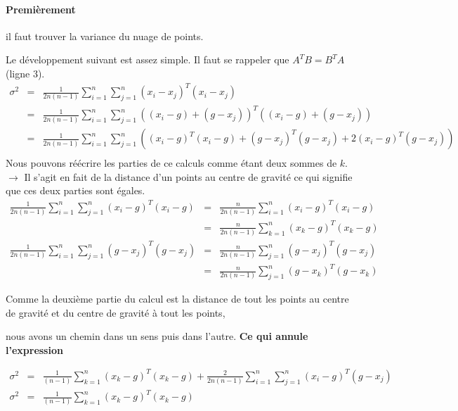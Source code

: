 \documentclass[a4paper, 11pt, onecolumn]{article}
\begin{document}
\begin{enumerate}
\paragraph{Premièrement} il faut trouver la variance du nuage de points.
\begin{framed}
Le développement suivant est assez simple. Il faut se rappeler que $A^TB = B^TA$ (ligne 3).
\begin{eqnarray}
\sigma^2 &=& \frac{1}{2n(n-1)} \sum_{i=1}^n\sum_{j=1}^n(x_i - x_j)^T(x_i-x_j)\\
&=& \frac{1}{2n(n-1)} \sum_{i=1}^n\sum_{j=1}^n((x_i-g)+(g-x_j))^T((x_i-g)+(g-x_j))\\
&=& \frac{1}{2n(n-1)} \sum_{i=1}^n\sum_{j=1}^n((x_i-g)^T(x_i-g)+(g-x_j)^T(g-x_j)+2(x_i-g)^T(g-x_j))\\
\end{eqnarray}
Nous pouvons réécrire les parties de ce calculs comme étant deux sommes de $k$.
$\rightarrow$ Il s'agit en fait de la distance d'un points au centre de gravité ce qui signifie que ces deux parties sont égales.
\begin{eqnarray}
\frac{1}{2n(n-1)} \sum_{i=1}^n\sum_{j=1}^n(x_i-g)^T(x_i-g) &=& \frac{n}{2n(n-1)}  \sum_{i=1}^n (x_i-g)^T(x_i-g)\\
 &=& \frac{n}{2n(n-1)}  \sum_{k=1}^n (x_k-g)^T(x_k-g)\\
\frac{1}{2n(n-1)} \sum_{i=1}^n\sum_{j=1}^n(g-x_j)^T(g-x_j) &=& \frac{n}{2n(n-1)} \sum_{j=1}^n (g-x_j)^T(g-x_j)\\
 &=& \frac{n}{2n(n-1)} \sum_{j=1}^n (g-x_k)^T(g-x_k)
\end{eqnarray}
\begin{description}
  \item {Comme la deuxième partie du calcul est la distance de tout les points au centre de
    gravité et du centre de gravité à tout les points,}
  \item {nous avons un chemin dans un sens puis dans l'autre. \textbf{Ce qui annule
    l'expression}}
\end{description}
\begin{eqnarray}
\sigma^2 &=& \frac{1}{(n-1)}  \sum_{k=1}^n (x_k-g)^T(x_k-g) + \frac{2}{2n(n-1)}\sum_{i=1}^n\sum_{j=1}^n(x_i-g)^T(g-x_j)\\
\sigma^2 &=& \frac{1}{(n-1)}  \sum_{k=1}^n (x_k-g)^T(x_k-g)
\end{eqnarray}
\end{framed}


\end{enumerate}
\end{document}
